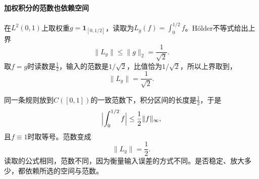 \paragraph{加权积分的范数也依赖空间}
在$L^2(0,1)$上取权重$g=\mathbf{1}_{[0,1/2]}$，读取为$L_g(f)=\int_0^{1/2}f$。Hölder不等式给出上界
\[
\lVert L_g\rVert\leq\lVert g\rVert_2=\frac1{\sqrt2} .
\]
取$f=g$时读数是$\tfrac12$，输入的范数是$1/\sqrt2$，比值恰为$1/\sqrt2$，所以上界取到，
\[
\lVert L_g\rVert=\frac1{\sqrt2} .
\]

同一条规则放到$C([0,1])$的一致范数下，积分区间的长度是$\tfrac12$，于是
\[
\Bigl\lvert\int_0^{1/2}f\Bigr\rvert\leq\frac12\lVert f\rVert_\infty ,
\]
且$f\equiv1$时取等号。范数变成
\[
\lVert L_g\rVert=\frac12 .
\]
读取的公式相同，范数不同，因为衡量输入误差的方式不同。是否稳定、放大多少，都依赖所选的空间与范数。
